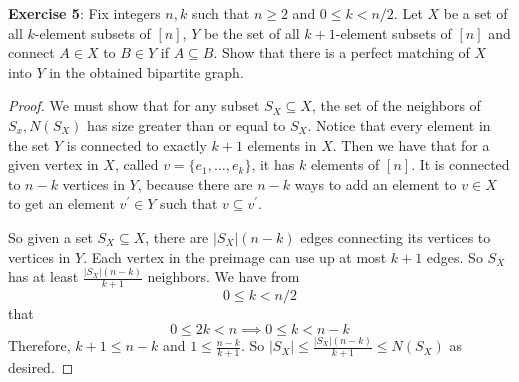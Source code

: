 \documentclass{article}
\begin{document}
\textbf{Exercise 5}: Fix integers $n, k$ such that $n \geq 2$ and $0 \leq k < n/2$. Let $X$ be a set of all $k$-element subsets of $[n]$, $Y$ be the set of all $k + 1$-element subsets of $[n]$ and connect $A \in X$ to $B \in Y$ if $A \subseteq B$. Show that there is a perfect matching of $X$ into $Y$ in the obtained bipartite graph.
    \begin{proof}
        We must show that for any subset $S_{X} \subseteq X$, the set of the neighbors of $S_{x}, N(S_{X})$ has size greater than or equal to $S_{X}$. Notice that every element in the set $Y$ is connected to exactly $k + 1$ elements in $X$. Then we have that for a given vertex in $X$, called $v = \{e_{1}, \ldots, e_{k}\}$, it has $k$ elements of $[n]$. It is connected to $n - k$ vertices in $Y$, because there are $n - k$ ways to add an element to $v \in X$ to get an element $v^{\prime} \in Y$ such that $v \subseteq v^{\prime}$.

        So given a set $S_{X} \subseteq X$, there are $\lvert S_{X} \rvert (n - k)$ edges connecting its vertices to vertices in $Y$. Each vertex in the preimage can use up at most $k + 1$ edges. So $S_{X}$ has at least $\frac{\lvert S_{X} \rvert (n - k)}{k + 1}$ neighbors. We have from 
            \begin{equation*}
                0 \leq k < n/2
            \end{equation*}
        that
            \begin{equation*}
                0 \leq 2k < n \implies 0 \leq k < n - k
            \end{equation*}
        Therefore, $k + 1 \leq n - k$ and $1 \leq \frac{n - k}{k + 1}$. So $\lvert S_{X} \rvert \leq\frac{\lvert S_{X} \rvert (n - k)}{k + 1} \leq N(S_{X})$ as desired.
    \end{proof}
\end{document}
